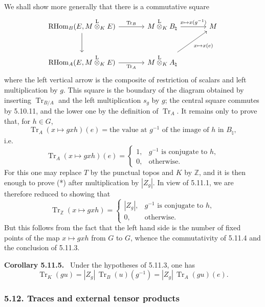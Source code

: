 \documentclass[11pt]{article}
\newenvironment{statement}[1]{\par\medskip\noindent\textbf{#1.}\ }{\par\medskip}
\providecommand{\RHom}{\mathrm{RHom}}
\providecommand{\Tr}{\operatorname{Tr}}
\providecommand{\Tr}{\operatorname{Tr}}
\providecommand{\lten}{\overset{\mathrm L}{\otimes}}
\providecommand{\Tr}{\operatorname{Tr}}
\providecommand{\RHom}{\mathrm{RHom}}
\providecommand{\lten}{\overset{\mathrm L}{\otimes}}
\providecommand{\RHom}{\mathrm R\mathcal{H}om}
\providecommand{\lten}{\overset{\mathrm L}{\otimes}}
\providecommand{\Tr}{\operatorname{Tr}}
\providecommand{\lten}{\overset{\mathrm L}{\otimes}}
\providecommand{\lten}{\overset{\mathrm L}{\otimes}}
\providecommand{\lten}{\overset{\mathrm L}{\otimes}}
\providecommand{\RHom}{\mathrm{RHom}}
\begin{document}
We shall show more generally that there is a commutative square
\[
\begin{tikzcd}[column sep=large,row sep=large]
\RHom_B(E,M\lten_KE) \arrow[r,"\Tr_B"] \arrow[d] & M\lten_KB_\natural \arrow[r,"x\mapsto x(g^{-1})"] & M\\
\RHom_A(E,M\lten_KE) \arrow[r,"\Tr_A"'] & M\lten_KA_\natural \arrow[ur,"x\mapsto x(e)"'] &
\end{tikzcd}
\]
where the left vertical arrow is the composite of restriction of scalars and left multiplication by $g$. This square is the boundary of the diagram obtained by inserting $\Tr_{B/A}$ and the left multiplication $s_g$ by $g$; the central square commutes by 5.10.11, and the lower one by the definition of $\Tr_A$. It remains only to prove that, for $h\in G$,
\[
\Tr_A(x\mapsto gxh)(e)=\text{the value at }g^{-1}\text{ of the image of }h\text{ in }B_\natural,
\]
i.e.
\begin{equation}\tag{*}
\Tr_A(x\mapsto gxh)(e)=
\begin{cases}
1,& g^{-1}\text{ is conjugate to }h,\\
0,& \text{otherwise}.
\end{cases}
\end{equation}
For this one may replace $T$ by the punctual topos and $K$ by $\mathbb Z$, and it is then enough to prove (*) after multiplication by $|Z_g|$. In view of 5.11.1, we are therefore reduced to showing that
\[
\Tr_{\mathbb Z}(x\mapsto gxh)=
\begin{cases}
|Z_g|,& g^{-1}\text{ is conjugate to }h,\\
0,& \text{otherwise}.
\end{cases}
\]
But this follows from the fact that the left hand side is the number of fixed points of the map $x\mapsto gxh$ from $G$ to $G$, whence the commutativity of 5.11.4 and the conclusion of 5.11.3.

\begin{statement}{Corollary 5.11.5}
Under the hypotheses of 5.11.3, one has
\begin{equation}\tag{5.11.5}
\Tr_K(gu)=|Z_g|\,\Tr_B(u)(g^{-1})=|Z_g|\,\Tr_A(gu)(e).
\end{equation}
\end{statement}

\subsubsection*{5.12. Traces and external tensor products}
\end{document}
